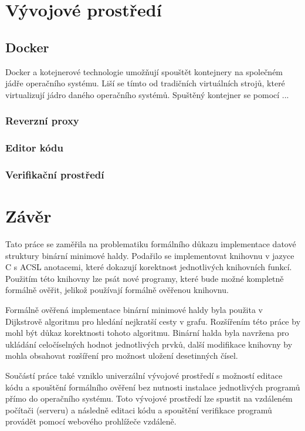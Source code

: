 \chapter{Vývojové prostředí}
\label{chapter:development-environment}

\section{Docker}

Docker a kotejnerové technologie umožňují spouštět kontejnery na společném jádře operačního systému. Liší se tímto od tradičních virtuálních strojů, které virtualizují jádro daného operačního systémů. Spuštěný kontejner se pomocí ... \cite{LinuxBible2020}

\subsection{Reverzní proxy}

\subsection{Editor kódu}

\subsection{Verifikační prostředí}

\chapter*{Závěr}

Tato práce se zaměřila na problematiku formálního důkazu implementace datové struktury binární minimové haldy. Podařilo se implementovat knihovnu v jazyce C s ACSL anotacemi, které dokazují korektnost jednotlivých knihovních funkcí. Použitím této knihovny lze psát nové programy, které bude možné kompletně formálně ověřit, jelikož používají formálně ověřenou knihovnu.

Formálně ověřená implementace binární minimové haldy byla použita v Dijkstrově algoritmu pro hledání nejkratší cesty v grafu. Rozšířením této práce by mohl být důkaz korektnosti tohoto algoritmu. Binární halda byla navržena pro ukládání celočíselných hodnot jednotlivých prvků, další modifikace knihovny by mohla obsahovat rozšíření pro možnost uložení desetinných čísel.

Součástí práce také vzniklo univerzální vývojové prostředí s možností editace kódu a spouštění formálního ověření bez nutnosti instalace jednotlivých programů přímo do operačního systému. Toto vývojové prostředí lze spustit na vzdáleném počítači (serveru) a následně editaci kódu a spouštění verifikace programů provádět pomocí webového prohlížeče vzdáleně.